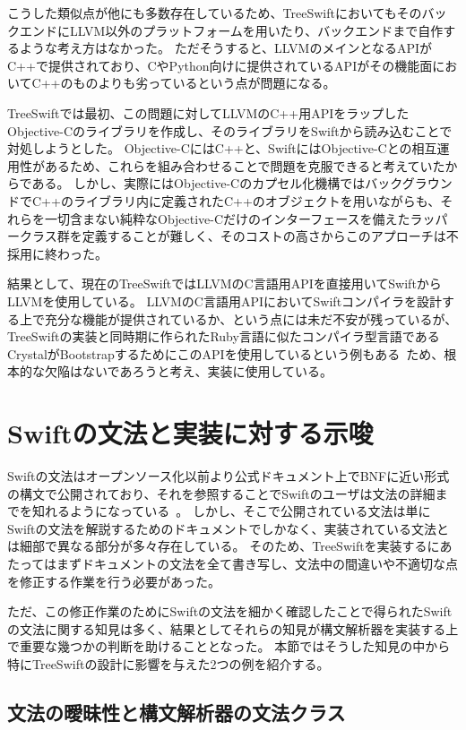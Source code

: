 こうした類似点が他にも多数存在しているため、TreeSwiftにおいてもそのバックエンドにLLVM以外のプラットフォームを用いたり、バックエンドまで自作するような考え方はなかった。
ただそうすると、LLVMのメインとなるAPIがC++で提供されており、CやPython向けに提供されているAPIがその機能面においてC++のものよりも劣っているという点が問題になる。

TreeSwiftでは最初、この問題に対してLLVMのC++用APIをラップしたObjective-Cのライブラリを作成し、そのライブラリをSwiftから読み込むことで対処しようとした。
Objective-CにはC++と、SwiftにはObjective-Cとの相互運用性があるため、これらを組み合わせることで問題を克服できると考えていたからである。
しかし、実際にはObjective-Cのカプセル化機構ではバックグラウンドでC++のライブラリ内に定義されたC++のオブジェクトを用いながらも、それらを一切含まない純粋なObjective-Cだけのインターフェースを備えたラッパークラス群を定義することが難しく、そのコストの高さからこのアプローチは不採用に終わった。

結果として、現在のTreeSwiftではLLVMのC言語用APIを直接用いてSwiftからLLVMを使用している。
LLVMのC言語用APIにおいてSwiftコンパイラを設計する上で充分な機能が提供されているか、という点には未だ不安が残っているが、TreeSwiftの実装と同時期に作られたRuby言語に似たコンパイラ型言語であるCrystalがBootstrapするためにこのAPIを使用しているという例もある~\cite{crystal}ため、根本的な欠陥はないであろうと考え、実装に使用している。


\section{Swiftの文法と実装に対する示唆}

Swiftの文法はオープンソース化以前より公式ドキュメント上でBNFに近い形式の構文で公開されており、それを参照することでSwiftのユーザは文法の詳細までを知れるようになっている~\cite{swift-grammar}。
しかし、そこで公開されている文法は単にSwiftの文法を解説するためのドキュメントでしかなく、実装されている文法とは細部で異なる部分が多々存在している。
そのため、TreeSwiftを実装するにあたってはまずドキュメントの文法を全て書き写し、文法中の間違いや不適切な点を修正する作業を行う必要があった。

ただ、この修正作業のためにSwiftの文法を細かく確認したことで得られたSwiftの文法に関する知見は多く、結果としてそれらの知見が構文解析器を実装する上で重要な幾つかの判断を助けることとなった。
本節ではそうした知見の中から特にTreeSwiftの設計に影響を与えた2つの例を紹介する。

\subsection{文法の曖昧性と構文解析器の文法クラス}

